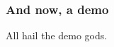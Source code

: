 \begin{frame}
	\frametitle{And now, a demo}

	\begin{block}{}
	\begin{center}
		All hail the demo gods.
	\end{center}
	\end{block}
\end{frame}
